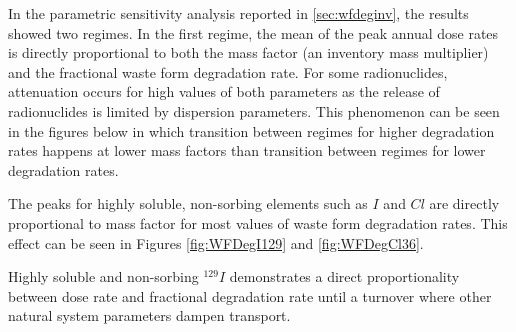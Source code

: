 In the parametric sensitivity analysis reported in \cite{huff_key_2012}
\ref{sec:wfdeginv}, the results showed two regimes. In the first regime, the
mean of the peak annual dose rates is directly proportional to both the mass
factor (an inventory mass multiplier) and the fractional waste
form degradation rate. For some radionuclides, attenuation occurs for high
values of both parameters as the release of radionuclides is limited by
dispersion parameters. This phenomenon can be seen in the figures below in which
transition between regimes for higher degradation rates happens at lower mass
factors than transition between regimes for lower degradation rates.

The peaks for highly soluble, non-sorbing elements such as $I$ and $Cl$
are directly proportional to mass factor for most
values of waste form degradation rates. This effect can be seen in Figures
\ref{fig:WFDegI129} and \ref{fig:WFDegCl36}.


Highly soluble and non-sorbing $^{129}I$ demonstrates a direct proportionality between dose rate and
fractional degradation rate until a turnover where other natural system
parameters dampen transport.

